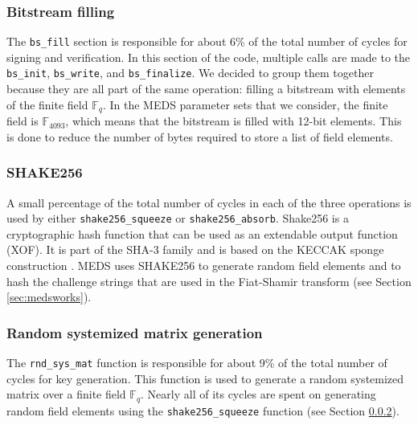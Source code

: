 \documentclass[11pt,a4paper]{report}
\theoremstyle{definition}
\begin{document}
\subsubsection{Bitstream filling}
The \texttt{bs\_fill} section is responsible for about 6\% of the total number of cycles for signing and verification. In this section of the code, multiple calls are made to the \texttt{bs\_init}, \texttt{bs\_write}, and \texttt{bs\_finalize}. We decided to group them together because they are all part of the same operation: filling a bitstream with elements of the finite field $\mathbb{F}_q$. In the MEDS parameter sets that we consider, the finite field is $\mathbb{F}_{4093}$, which means that the bitstream is filled with 12-bit elements. This is done to reduce the number of bytes required to store a list of field elements.

\subsubsection{SHAKE256}
\label{sec:shake256}
A small percentage of the total number of cycles in each of the three operations is used by either \texttt{shake256\_squeeze} or \texttt{shake256\_absorb}. Shake256 is a cryptographic hash function that can be used as an extendable output function (XOF). It is part of the SHA-3 family \cite{dworkin2015sha} and is based on the KECCAK sponge construction \cite{bertoni2013keccak}. MEDS uses SHAKE256 to generate random field elements and to hash the challenge strings that are used in the Fiat-Shamir transform (see Section \ref{sec:medsworks}).

\subsubsection{Random systemized matrix generation}
The \texttt{rnd\_sys\_mat} function is responsible for about 9\% of the total number of cycles for key generation. This function is used to generate a random systemized matrix over a finite field $\mathbb{F}_q$. Nearly all of its cycles are spent on generating random field elements using the \texttt{shake256\_squeeze} function (see Section \ref{sec:shake256}).
\end{document}

